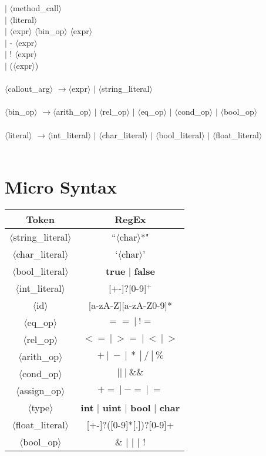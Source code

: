\documentclass{article}
\newcommand{\angl}[1]{$\langle$#1$\rangle$}
\newcommand{\lra}[0]{$\longrightarrow$}
\begin{document}
\begin{tabbing}
\> $|$ \angl{method\_call} \\
\> $|$ \angl{literal} \\
\> $|$ \angl{expr} \angl{bin\_op} \angl{expr} \\
\> $|$ - \angl{expr} \\
\> $|$ ! \angl{expr} \\
\> $|$ (\angl{expr}) \\ \\
\angl{callout\_arg} \lra \angl{expr} $|$ \angl{string\_literal} \\ \\
\angl{bin\_op} \lra \angl{arith\_op} $|$ \angl{rel\_op} $|$ \angl{eq\_op} $|$ \angl{cond\_op} $|$ \angl{bool\_op} \\ \\
\angl{literal} \lra \angl{int\_literal} $|$ \angl{char\_literal} $|$ \angl{bool\_literal} $|$ \angl{float\_literal} \\ \\
\end{tabbing}

\section{Micro Syntax}

\begin{tabular}{|c|c|} \hline
Token & RegEx \\ \hline
\angl{string\_literal} & ``\angl{char}*"  \\ \hline
\angl{char\_literal} & `\angl{char}'  \\ \hline
\angl{bool\_literal} & \textbf{true} $|$ \textbf{false}  \\ \hline
\angl{int\_literal} & [+-]?[0-9]$^+$  \\ \hline
\angl{id} & [a-zA-Z][a-zA-Z0-9]*  \\ \hline
\angl{eq\_op} & $ ==\ |\ !=$  \\ \hline
\angl{rel\_op} & $<=\ |\ >=\ |\ <\ |\ >$  \\ \hline
\angl{arith\_op} & $+\ |\ -\ |\ *\ |\ /\ |\ \%$  \\ \hline
\angl{cond\_op} & $||\ |\ \&\&$ \\ \hline
\angl{assign\_op} & $+=\ |\ -=\ |\ =$  \\ \hline
\angl{type} & \textbf{int} $|$ \textbf{uint} $|$ \textbf{bool} $|$ \textbf{char}  \\ \hline
\angl{float\_literal} & [+-]?([0-9]*[.])?[0-9]+ \\ \hline
\angl{bool\_op} & \& $|$ $|$ $|$ ! \\ \hline
\end{tabular}
\end{document}
